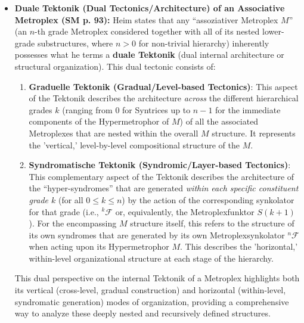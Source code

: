 \documentclass[12pt]{article}
\newcommand{\q}[1]{\enquote{#1}}
\def\metroplex#1#2{M}%
\newcommand{\hypermetrophor}[1]{%
  \metroplex{#1}{a}%
}
\newcommand{\metroplexsynkolator}[1]{{}^{#1}\mathcal{F}}
\newcommand{\metroplexfunktor}{S}
\begin{document}
\begin{itemize}
    \item \textbf{Duale Tektonik (Dual Tectonics/Architecture) of an Associative Metroplex (SM p. 93):}
    Heim states that any \q{assoziativer Metroplex \( \metroplex{n}{} \)} (an \(n\)-th grade Metroplex considered together with all of its nested lower-grade substructures, where \( n > 0 \) for non-trivial hierarchy) inherently possesses what he terms a \textbf{duale Tektonik} (dual internal architecture or structural organization). This dual tectonic consists of:
    \begin{enumerate}
        \item \textbf{Graduelle Tektonik (Gradual/Level-based Tectonics)}: This aspect of the Tektonik describes the architecture \textit{across} the different hierarchical grades \( k \) (ranging from \( 0 \) for Syntrices up to \( n-1 \) for the immediate components of the Hypermetrophor of \( \metroplex{n}{} \)) of all the associated Metroplexes that are nested within the overall \( \metroplex{n}{} \) structure. It represents the 'vertical,' level-by-level compositional structure of the \( \metroplex{n}{} \).
        \item \textbf{Syndromatische Tektonik (Syndromic/Layer-based Tectonics)}: This complementary aspect of the Tektonik describes the architecture of the \q{hyper-syndromes} that are generated \textit{within each specific constituent grade \( k \)} (for all \( 0 \leq k \leq n \)) by the action of the corresponding synkolator for that grade (i.e., \( \metroplexsynkolator{k}{} \) or, equivalently, the Metroplexfunktor \( \metroplexfunktor(k+1) \)). For the encompassing \( \metroplex{n}{} \) structure itself, this refers to the structure of its own syndromes that are generated by its own Metroplexsynkolator \( \metroplexsynkolator{n}{} \) when acting upon its Hypermetrophor \( \hypermetrophor{n-1}{} \). This describes the 'horizontal,' within-level organizational structure at each stage of the hierarchy.
    \end{enumerate}
    This dual perspective on the internal Tektonik of a Metroplex highlights both its vertical (cross-level, gradual construction) and horizontal (within-level, syndromatic generation) modes of organization, providing a comprehensive way to analyze these deeply nested and recursively defined structures.


\end{itemize}
\end{document}
